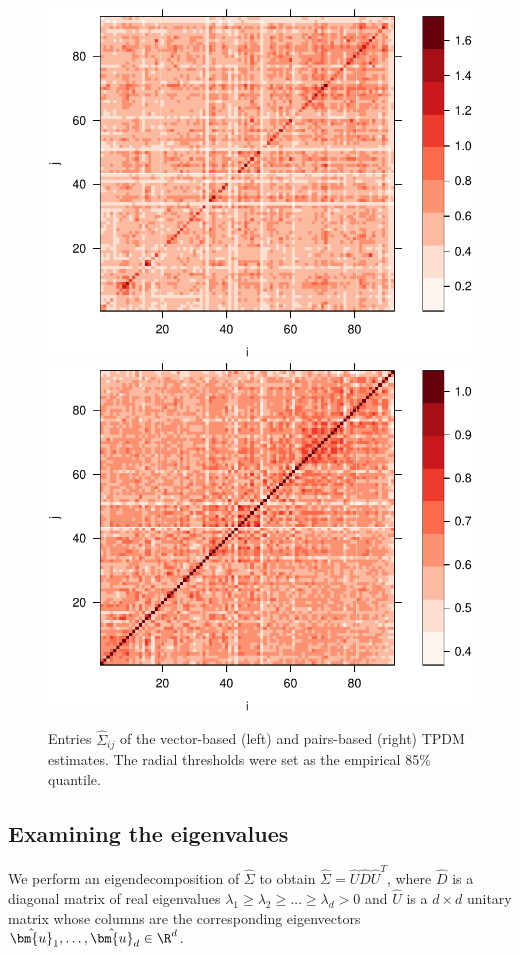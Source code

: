\documentclass[en-GB, a4paper, nobind]{templates/bathreport}
\begin{document}
\begin{figure}

{\centering \includegraphics[width=0.48\linewidth]{figures/fr-tpdm-levelplot-1} \includegraphics[width=0.48\linewidth]{figures/fr-tpdm-levelplot-2} 

}

\caption[Entries of the vector- and pairs-based TPDM estimates. ]{Entries $\hat{\Sigma}_{ij}$ of the vector-based (left) and pairs-based (right) TPDM estimates. The radial thresholds were set as the empirical 85\% quantile.}\label{fig:fr-tpdm-levelplot}
\end{figure}

\hypertarget{fr-eigenvalues}{%
\subsection{Examining the eigenvalues}\label{fr-eigenvalues}}

We perform an eigendecomposition of \(\hat{\Sigma}\) to obtain \(\hat{\Sigma}=\hat{U}\hat{D}\hat{U}^T\), where \(\hat{D}\) is a diagonal matrix of real eigenvalues \(\lambda_1\geq\lambda_2\geq\ldots\geq\lambda_d>0\) and \(\hat{U}\) is a \(d\times d\) unitary matrix whose columns are the corresponding eigenvectors \(\hat{\bm{u}}_1,\ldots,\hat{\bm{u}}_d\in\R^d\).
\end{document}

